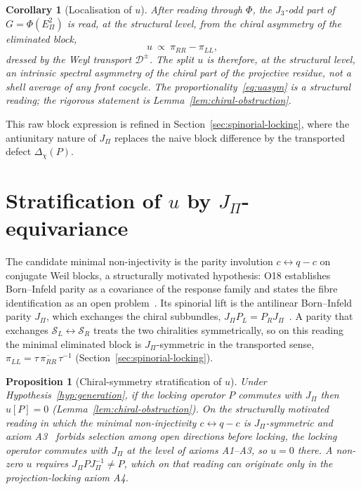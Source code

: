 \documentclass[11pt]{article}
\newtheorem{proposition}{Proposition}
\newtheorem{corollary}{Corollary}
\theoremstyle{definition}
\newcommand{\Deff}{\mathcal D}
\begin{document}
    \begin{corollary}[Localisation of $u$]
      \label{cor:localise}
      After reading through $\Phi$, the $J_3$-odd part of $G=\Phi(E_\Pi^2)$ is read, at the structural level, from the chiral
      asymmetry of the eliminated block,
      \begin{equation}
        \label{eq:uasym}
        u\ \propto\ \pi_{RR}-\pi_{LL},
      \end{equation}
      dressed by the Weyl transport $\Deff^{\pm}$.
      The split $u$ is therefore, at the structural level, an intrinsic spectral asymmetry of the chiral part of the
      projective residue, not a shell average of any front cocycle.
      The proportionality~\eqref{eq:uasym} is a structural reading; the rigorous statement is
      Lemma~\ref{lem:chiral-obstruction}.
    \end{corollary}

    This raw block expression is refined in Section~\ref{sec:spinorial-locking}, where the antiunitary
    nature of $J_\Pi$ replaces the naive block difference by the transported defect $\Delta_\chi(P)$.

  \section{Stratification of \texorpdfstring{$u$}{u} by \texorpdfstring{$J_\Pi$}{JΠ}-equivariance}
    \label{sec:strat}

    The candidate minimal non-injectivity is the parity involution $c\leftrightarrow q-c$ on
    conjugate Weil blocks, a structurally motivated hypothesis: O18 establishes Born--Infeld
    parity as a covariance of the response family and states the fibre identification as an open
    problem~\cite{Beau2026a22}.
    Its spinorial lift is the antilinear Born--Infeld parity $J_\Pi$, which exchanges the chiral
    subbundles, $J_\Pi P_L=P_R J_\Pi$~\cite{Beau2026q14}.
    A parity that exchanges $\mathcal S_L\leftrightarrow\mathcal S_R$ treats the two chiralities
    symmetrically, so on this reading the minimal eliminated block is $J_\Pi$-symmetric in the transported sense,
    $\pi_{LL}=\tau\,\overline{\pi_{RR}}\,\tau^{-1}$ (Section~\ref{sec:spinorial-locking}).

    \begin{proposition}[Chiral-symmetry stratification of $u$]
      \label{prop:strat}
      Under Hypothesis~\ref{hyp:generation}, if the locking operator $P$ commutes with $J_\Pi$ then $u[P]=0$
      (Lemma~\ref{lem:chiral-obstruction}).
      On the structurally motivated reading in which the minimal non-injectivity $c\leftrightarrow q-c$ is
      $J_\Pi$-symmetric and axiom A3~\cite{Beau2026m} forbids selection among open directions before locking, the
      locking operator commutes with $J_\Pi$ at the level of axioms A1--A3, so $u=0$ there.
      A non-zero $u$ requires $J_\Pi PJ_\Pi^{-1}\neq P$, which on that reading can originate only in the
      projection-locking
      axiom A4.
    \end{proposition}
\end{document}
